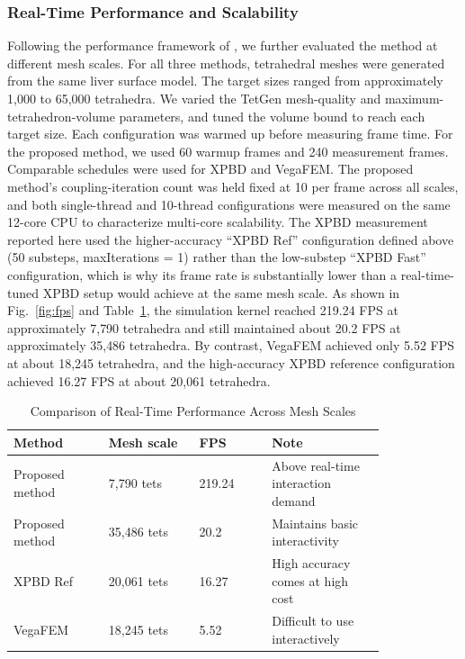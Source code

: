 \documentclass{ieeeaccess}
\begin{document}
\subsubsection{Real-Time Performance and Scalability}
Following the performance framework of \cite{wang2025group}, we further evaluated the method at different mesh scales. For all three methods, tetrahedral meshes were generated from the same liver surface model. The target sizes ranged from approximately 1,000 to 65,000 tetrahedra. We varied the TetGen mesh-quality and maximum-tetrahedron-volume parameters, and tuned the volume bound to reach each target size. Each configuration was warmed up before measuring frame time. For the proposed method, we used 60 warmup frames and 240 measurement frames. Comparable schedules were used for XPBD and VegaFEM. The proposed method's coupling-iteration count was held fixed at 10 per frame across all scales, and both single-thread and 10-thread configurations were measured on the same 12-core CPU to characterize multi-core scalability. The XPBD measurement reported here used the higher-accuracy ``XPBD Ref'' configuration defined above (50 substeps, maxIterations = 1) rather than the low-substep ``XPBD Fast'' configuration, which is why its frame rate is substantially lower than a real-time-tuned XPBD setup would achieve at the same mesh scale. As shown in Fig.~\ref{fig:fps} and Table~\ref{tab:fps}, the simulation kernel reached 219.24 FPS at approximately 7{,}790 tetrahedra and still maintained about 20.2 FPS at approximately 35{,}486 tetrahedra. By contrast, VegaFEM achieved only 5.52 FPS at about 18{,}245 tetrahedra, and the high-accuracy XPBD reference configuration achieved 16.27 FPS at about 20{,}061 tetrahedra.

\begin{table}[htbp]
\caption{Comparison of Real-Time Performance Across Mesh Scales}
\label{tab:fps}
\centering
\footnotesize
\renewcommand{\arraystretch}{1.15}
\begin{tabular}{|p{0.21\linewidth}|p{0.20\linewidth}|p{0.16\linewidth}|p{0.25\linewidth}|}
\hline
Method & Mesh scale & FPS & Note \\
\hline
Proposed method & 7,790 tets & 219.24 & Above real-time interaction demand \\
\hline
Proposed method & 35,486 tets & 20.2 & Maintains basic interactivity \\
\hline
XPBD Ref & 20,061 tets & 16.27 & High accuracy comes at high cost \\
\hline
VegaFEM & 18,245 tets & 5.52 & Difficult to use interactively \\
\hline
\end{tabular}
\end{table}
\end{document}
